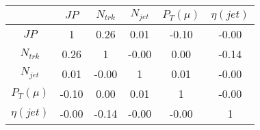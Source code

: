 \begin{tabular}{|c|c|c|c|c|c|} 
\hline
 & $JP$ & $N_{trk}$ & $N_{jet}$ & $P_{T} (\mu)$ & $\eta (jet)$ \\ \hline
$JP$ & 1 & 0.26 & 0.01 & -0.10 & -0.00 \\
$N_{trk}$ & 0.26 & 1 & -0.00 & 0.00 & -0.14 \\
$N_{jet}$ & 0.01 & -0.00 & 1 & 0.01 & -0.00 \\
$P_{T} (\mu)$ & -0.10 & 0.00 & 0.01 & 1 & -0.00 \\
$\eta (jet)$ & -0.00 & -0.14 & -0.00 & -0.00 & 1 \\
\hline 
\end{tabular} 


